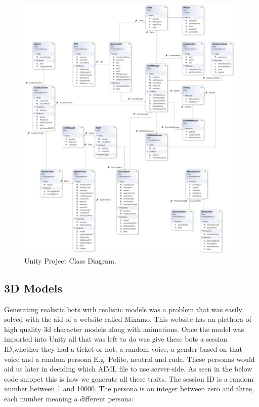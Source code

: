 \begin{figure}[h!]
	\caption{Unity Project Class Diagram.}
	\label{image:ClassDiagram}
	\centering
	\includegraphics[width=1\textwidth]{Images/ClassDiagram.png}
\end{figure}

\subsection{3D Models}
Generating realistic bots with realistic models was a problem that was easily solved with the aid of a website called Mixamo\cite{Mixamo31:online}. This website has an plethora of high quality 3d character models along with animations. Once the model was imported into Unity all that was left to do was give these bots a session ID,whether they had a ticket or not, a random voice, a gender based on that voice and a random persona E.g. Polite, neutral and rude. These personas would aid us later in deciding which AIML file to use server-side. As seen in the below code snippet this is how we generate all these traits. The session ID is a random number between 1 and 10000. The persona is an integer between zero and three, each number meaning a different persona: 

